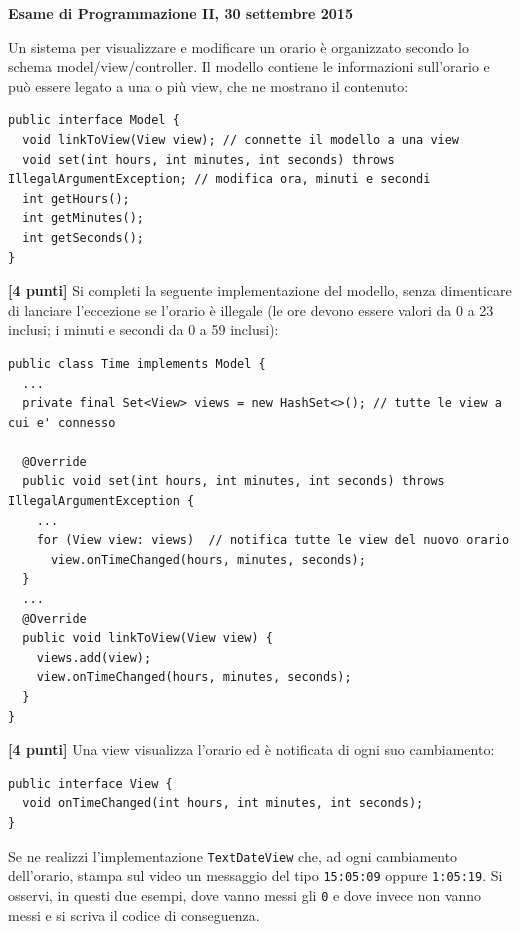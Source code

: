 \documentclass{article}[10pt]
\newcounter{esnu}
\newenvironment{esercizio}{\medskip \noindent {\bf Esercizio\addtocounter{esnu}{1} \arabic{esnu}}}{}
\begin{document}
\begin{center} {\bf Esame di Programmazione II, 30 settembre 2015}\end{center}

Un sistema per visualizzare e modificare un orario \`e organizzato secondo lo schema
model/view/controller. Il modello contiene le informazioni sull'orario e pu\`o essere
legato a una o pi\`u view, che ne mostrano il contenuto:

{\scriptsize\begin{verbatim}
public interface Model {
  void linkToView(View view); // connette il modello a una view
  void set(int hours, int minutes, int seconds) throws IllegalArgumentException; // modifica ora, minuti e secondi
  int getHours();
  int getMinutes();
  int getSeconds();
}
\end{verbatim}}

\begin{esercizio}
\textbf{[4 punti]}
Si completi la seguente implementazione del modello, senza dimenticare di lanciare l'eccezione
se l'orario \`e illegale (le ore devono essere valori
da 0 a 23 inclusi; i minuti e secondi da 0 a 59 inclusi):

{\scriptsize\begin{verbatim}
public class Time implements Model {
  ...
  private final Set<View> views = new HashSet<>(); // tutte le view a cui e' connesso

  @Override
  public void set(int hours, int minutes, int seconds) throws IllegalArgumentException {
    ...
    for (View view: views)  // notifica tutte le view del nuovo orario
      view.onTimeChanged(hours, minutes, seconds);
  }
  ...
  @Override
  public void linkToView(View view) {
    views.add(view);
    view.onTimeChanged(hours, minutes, seconds);
  }
}
\end{verbatim}}
\end{esercizio}

\begin{esercizio}
\textbf{[4 punti]}
Una view visualizza l'orario ed \`e notificata di ogni suo cambiamento:

{\scriptsize\begin{verbatim}
public interface View {
  void onTimeChanged(int hours, int minutes, int seconds);
}
\end{verbatim}}

\noindent
Se ne realizzi l'implementazione \texttt{TextDateView} che, ad ogni cambiamento dell'orario,
stampa sul video un messaggio del tipo \texttt{15:05:09} oppure
\texttt{1:05:19}. Si osservi, in questi due esempi,
dove vanno messi gli \texttt{0} e dove invece non vanno messi e si scriva il codice
di conseguenza.
\end{esercizio}
\end{document}
